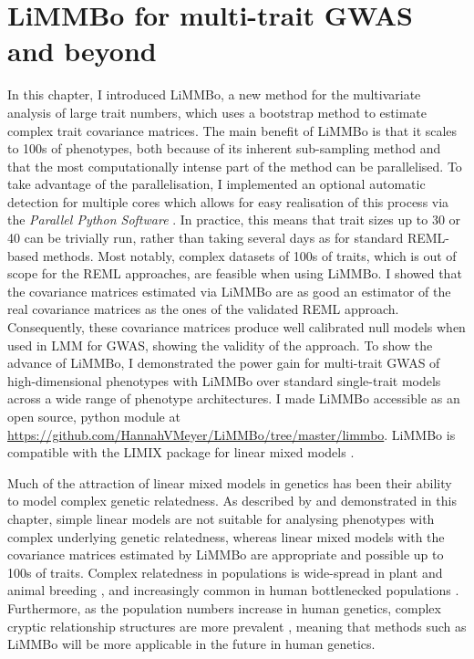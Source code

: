 \section{LiMMBo for multi-trait GWAS and beyond}
In this chapter, I introduced LiMMBo, a new method for the multivariate analysis of large trait numbers, which uses a bootstrap method to estimate complex trait covariance matrices. The main benefit of LiMMBo is that it scales to \num{100}s of phenotypes, both because of its inherent sub-sampling method and that the most computationally intense part of the method can be parallelised. To take advantage of the parallelisation, I implemented an optional automatic detection for multiple cores which allows for easy realisation of this process via the \textit{Parallel Python Software} \citep{PPSoftware}. In practice, this means that trait sizes up to 30 or 40 can be trivially run, rather than taking several days as for standard REML-based methods. Most notably, complex datasets of \num{100}s of traits, which is out of scope for the REML approaches, are feasible when using LiMMBo. I showed that the covariance matrices estimated via LiMMBo are as good an estimator of the real covariance matrices as the ones of the validated REML approach. Consequently, these covariance matrices produce well calibrated null models when used in LMM for GWAS, showing the validity of the approach. To show the advance of LiMMBo, I demonstrated the power gain for multi-trait GWAS of high-dimensional phenotypes with LiMMBo over standard single-trait models across a wide range of phenotype architectures. I made LiMMBo accessible as an open source, python module at \url{https://github.com/HannahVMeyer/LiMMBo/tree/master/limmbo}. LiMMBo is compatible with the LIMIX package for linear mixed models \citep{Lippert2014}.  

Much of the attraction of linear mixed models in genetics has been their ability to model complex genetic relatedness. As described by \citep{Kang2010} and demonstrated in this chapter, simple linear models are not suitable for analysing phenotypes with complex underlying genetic relatedness, whereas linear mixed models with the covariance matrices estimated by LiMMBo are appropriate and possible up to \num{100}s of traits. Complex relatedness in populations is wide-spread in plant and animal breeding \citep{Bolormaa2014,Yang2014}, and increasingly common in human bottlenecked populations \citep{Tachmazidou2013}. Furthermore, as the population numbers increase in human genetics, complex cryptic relationship structures are more prevalent \citep{Reich2001}, meaning that methods such as LiMMBo will be more applicable in the future in human genetics. 

